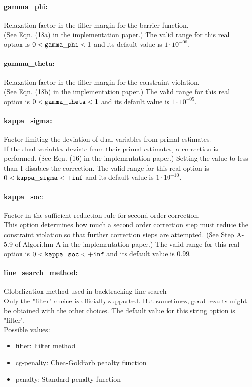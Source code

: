 \paragraph{gamma\_phi:}\label{opt:gamma_phi} Relaxation factor in the filter margin for the barrier function. \\
 (See Eqn. (18a) in the implementation paper.) The valid range for this real option is 
$0 <  {\tt gamma\_phi } <  1$
and its default value is $1 \cdot 10^{-08}$.


\paragraph{gamma\_theta:}\label{opt:gamma_theta} Relaxation factor in the filter margin for the constraint violation. \\
 (See Eqn. (18b) in the implementation paper.) The valid range for this real option is 
$0 <  {\tt gamma\_theta } <  1$
and its default value is $1 \cdot 10^{-05}$.


\paragraph{kappa\_sigma:}\label{opt:kappa_sigma} Factor limiting the deviation of dual variables from primal estimates. \\
 If the dual variables deviate from their primal estimates, a correction is performed. (See Eqn. (16) in the implementation paper.) Setting the value to less than 1 disables the correction. The valid range for this real option is 
$0 <  {\tt kappa\_sigma } <  {\tt +inf}$
and its default value is $1 \cdot 10^{+10}$.


\paragraph{kappa\_soc:}\label{opt:kappa_soc} Factor in the sufficient reduction rule for second order correction. \\
 This option determines how much a second order correction step must reduce the constraint violation so that further correction steps are attempted.  (See Step A-5.9 of Algorithm A in the implementation paper.) The valid range for this real option is 
$0 <  {\tt kappa\_soc } <  {\tt +inf}$
and its default value is $0.99$.


\paragraph{line\_search\_method:}\label{opt:line_search_method} Globalization method used in backtracking line search \\
 Only the "filter" choice is officially supported.  But sometimes, good results might be obtained with the other choices. The default value for this string option is "filter".
\\ 
Possible values:
\begin{itemize}
   \item filter: Filter method
   \item cg-penalty: Chen-Goldfarb penalty function
   \item penalty: Standard penalty function
\end{itemize}

